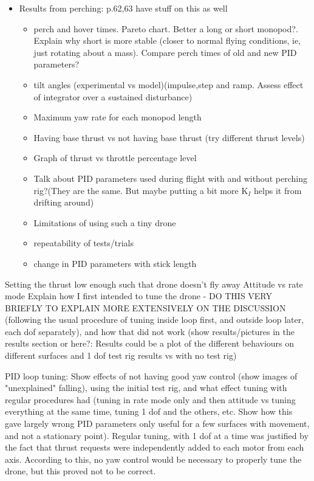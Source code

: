 \documentclass[12pt,a4paper]{article}
\begin{document}
\begin{itemize}
\begin{itemize}
\end{itemize} 
\item Results from perching: p.62,63 have stuff on this as well 
\begin{itemize}
\item perch and hover times. Pareto chart. Better a long or short monopod?. Explain why short is more stable (closer to normal flying conditions, ie, just rotating about a mass). Compare perch times of old and new PID parameters?
\item tilt angles (experimental vs model)(impulse,step and ramp. Assess effect of integrator over a sustained disturbance)
\item Maximum yaw rate for each monopod length
\item Having base thrust vs not having base thrust (try different thrust levels)
\item Graph of thrust vs throttle percentage level
\item Talk about PID parameters used during flight with and without perching rig?(They are the same. But maybe putting a bit more K$_I$ helps it from drifting around)
\item Limitations of using such a tiny drone
\item repeatability of tests/trials
\item change in PID parameters with stick length
\end{itemize}
\end{itemize}
Setting the thrust low enough such that drone doesn't fly away
Attitude vs rate mode
Explain how I first intended to tune the drone - DO THIS VERY BRIEFLY TO EXPLAIN MORE EXTENSIVELY ON THE DISCUSSION (following the usual procedure of tuning inside loop first, and outside loop later, each dof separately), and how that did not work (show results/pictures in the results section or here?: Results could be a plot of the different behaviours on different surfaces and 1 dof test rig results vs with no test rig) 


PID loop tuning: Show effects of not having good yaw control (show images of "unexplained" falling), using the initial test rig, and what effect tuning with regular procedures had (tuning in rate mode only and then attitude vs tuning everything at the same time, tuning 1 dof and the others, etc. Show how this gave largely wrong PID parameters only useful for a few surfaces with movement, and not a stationary point). Regular tuning, with 1 dof at a time was justified by the fact that thrust requests were independently added to each motor from each axis. According to this, no yaw control would be necessary to properly tune the drone, but this proved not to be correct.
\end{document}
